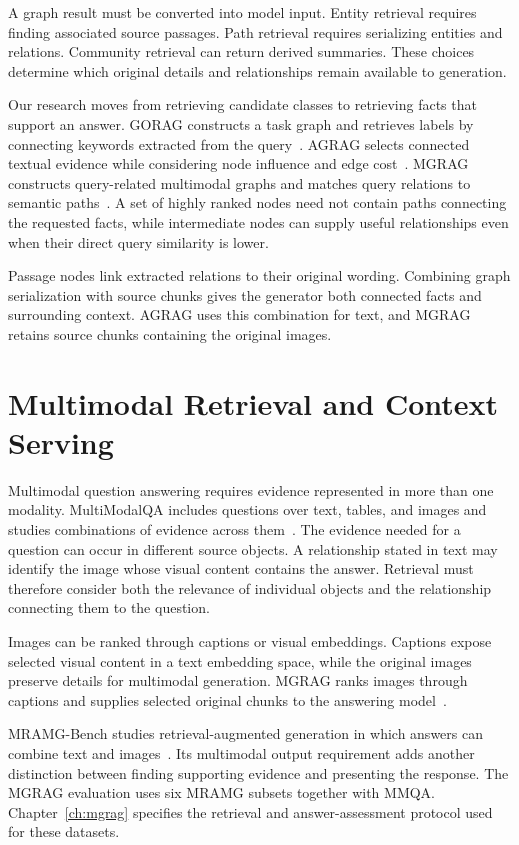 A graph result must be converted into model input. Entity retrieval requires finding associated source passages. Path retrieval requires serializing entities and relations. Community retrieval can return derived summaries. These choices determine which original details and relationships remain available to generation.

Our research moves from retrieving candidate classes to retrieving facts that support an answer. GORAG constructs a task graph and retrieves labels by connecting keywords extracted from the query~\cite{bg-gorag}. AGRAG selects connected textual evidence while considering node influence and edge cost~\cite{bg-agrag}. MGRAG constructs query-related multimodal graphs and matches query relations to semantic paths~\cite{bg-mgrag}. A set of highly ranked nodes need not contain paths connecting the requested facts, while intermediate nodes can supply useful relationships even when their direct query similarity is lower.

Passage nodes link extracted relations to their original wording. Combining graph serialization with source chunks gives the generator both connected facts and surrounding context. AGRAG uses this combination for text, and MGRAG retains source chunks containing the original images.

\section{Multimodal Retrieval and Context Serving}
\label{sec:background:multimodal}

Multimodal question answering requires evidence represented in more than one modality. MultiModalQA includes questions over text, tables, and images and studies combinations of evidence across them~\cite{bg-mmqa}. The evidence needed for a question can occur in different source objects. A relationship stated in text may identify the image whose visual content contains the answer. Retrieval must therefore consider both the relevance of individual objects and the relationship connecting them to the question.

Images can be ranked through captions or visual embeddings. Captions expose selected visual content in a text embedding space, while the original images preserve details for multimodal generation. MGRAG ranks images through captions and supplies selected original chunks to the answering model~\cite{bg-mgrag}.

MRAMG-Bench studies retrieval-augmented generation in which answers can combine text and images~\cite{bg-mramg}. Its multimodal output requirement adds another distinction between finding supporting evidence and presenting the response. The MGRAG evaluation uses six MRAMG subsets together with MMQA. Chapter~\ref{ch:mgrag} specifies the retrieval and answer-assessment protocol used for these datasets.

